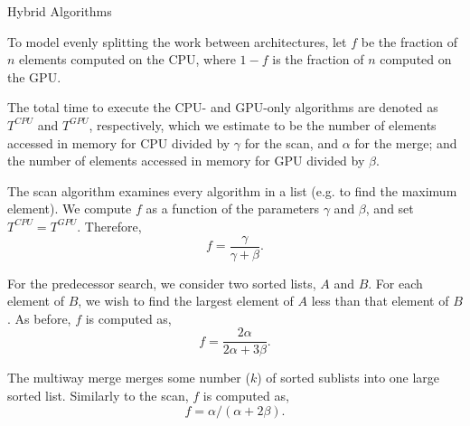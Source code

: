 \documentclass[final]{beamer}
\newlength{\colwidth}
\begin{document}
\begin{frame}[t]
\begin{columns}[t]
\begin{column}{\colwidth}
\begin{block}{Hybrid Algorithms}
\begin{description}[font=$\bullet$~\normalfont\scshape\color{red!50!black}]

\item To model evenly splitting the work between architectures, let $f$ be the fraction of $n$ elements computed on the CPU, where $1-f$ is the fraction of $n$ computed on the GPU.

\item The total time to execute the CPU- and GPU-only algorithms are denoted as $T^{CPU}$ and $T^{GPU}$, respectively,
  which we estimate to be the number of elements accessed in memory for CPU divided by $\gamma$ for the scan,
  and $\alpha$ for the merge; and the number of elements accessed in memory for GPU divided by $\beta$.

\end{description}

The scan algorithm examines every algorithm in a list (e.g. to find the maximum element).
We compute $f$ as a function of the parameters $\gamma$ and $\beta$, and set $T^{CPU}=T^{GPU}$. Therefore,
\begin{equation}f=\frac{\gamma}{\gamma+\beta}.\label{eqn:scan_split}\end{equation}


   For the predecessor search, we consider two sorted lists, $A$ and $B$. For each element of $B$, we wish to find the largest element of $A$
   less than that element of $B$.
   As before, $f$ is computed as,
\begin{equation}f=\frac{2\alpha}{2\alpha+3\beta}.\label{eqn:batch_predecessor_split}\end{equation}

The multiway merge merges some number ($k$) of sorted sublists into one large sorted list.
Similarly to the scan, $f$ is computed as,
\begin{equation}f=\alpha/(\alpha+2\beta)\label{eqn:multiway_split}.\end{equation}

  \end{block}


\end{column}
\end{columns}
\end{frame}
\end{document}
